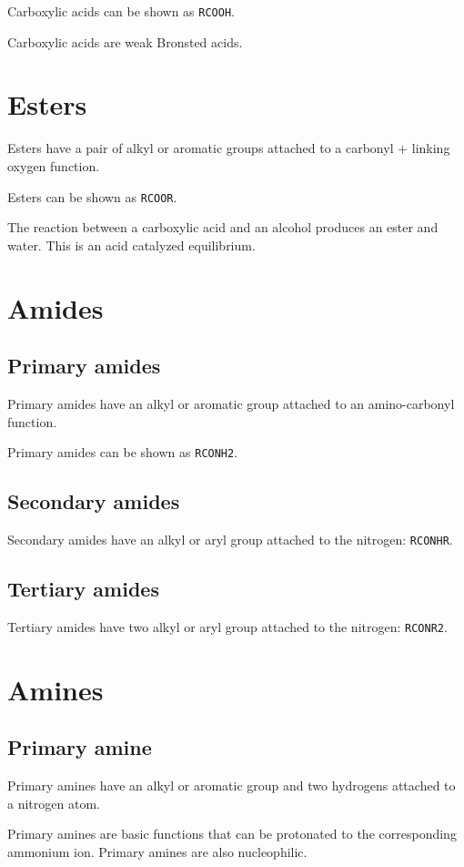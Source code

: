 \documentclass[12pt, oneside]{book}
\begin{document}
Carboxylic acids can be shown as \texttt{RCOOH}.

Carboxylic acids are weak Bronsted acids.

\section{Esters}
Esters have a pair of alkyl or aromatic groups attached to a carbonyl + linking
oxygen function.

Esters can be shown as \texttt{RCOOR}.

The reaction between a carboxylic acid and an alcohol produces an ester and
water.
This is an acid catalyzed equilibrium.

\section{Amides}
\subsection{Primary amides}
Primary amides have an alkyl or aromatic group attached to an amino-carbonyl
function.

Primary amides can be shown as \texttt{RCONH2}.

\subsection{Secondary amides}
Secondary amides have an alkyl or aryl group attached to the nitrogen:
\texttt{RCONHR}.

\subsection{Tertiary amides}
Tertiary amides have two alkyl or aryl group attached to the nitrogen:
\texttt{RCONR2}.

\section{Amines}
\subsection{Primary amine}
Primary amines have an alkyl or aromatic group and two hydrogens attached to a
nitrogen atom.

Primary amines are basic functions that can be protonated to the corresponding
ammonium ion.
Primary amines are also nucleophilic.
\end{document}
